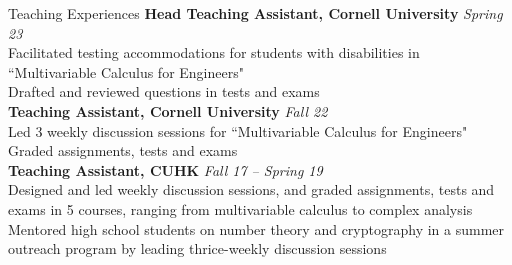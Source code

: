 \documentclass{resume} %
\begin{document}
\newpage

\begin{rSection}{Teaching Experiences}
\textbf{Head Teaching Assistant, Cornell University} \hfill {\em Spring 23}\\
Facilitated testing accommodations for students with disabilities in ``Multivariable Calculus for Engineers"\\
Drafted and reviewed questions in tests and exams\\
\textbf{Teaching Assistant, Cornell University} \hfill {\em Fall 22}\\
Led 3 weekly discussion sessions for ``Multivariable Calculus for Engineers"\\
Graded assignments, tests and exams\\
\textbf{Teaching Assistant, CUHK} \hfill {\em Fall 17 -- Spring 19}\\
Designed and led weekly discussion sessions, and graded assignments, tests and exams in 5 courses, ranging from multivariable calculus to complex analysis\\
Mentored high school students on number theory and cryptography in a summer outreach program by leading thrice-weekly discussion sessions

\end{rSection}
\end{document}
